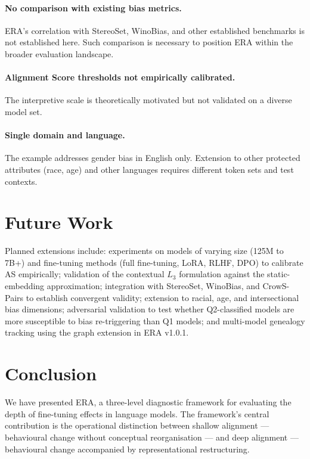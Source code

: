 \documentclass[11pt,a4paper]{article}
\begin{document}
\paragraph{No comparison with existing bias metrics.}
ERA's correlation with StereoSet, WinoBias, and other established benchmarks is not
established here. Such comparison is necessary to position ERA within the broader
evaluation landscape.

\paragraph{Alignment Score thresholds not empirically calibrated.}
The interpretive scale is theoretically motivated but not validated on a diverse model set.

\paragraph{Single domain and language.}
The example addresses gender bias in English only. Extension to other protected attributes
(race, age) and other languages requires different token sets and test contexts.

\section{Future Work}

Planned extensions include: experiments on models of varying size (125M to 7B+) and
fine-tuning methods (full fine-tuning, LoRA, RLHF, DPO) to calibrate AS empirically;
validation of the contextual $L_3$ formulation against the static-embedding approximation;
integration with StereoSet, WinoBias, and CrowS-Pairs to establish convergent validity;
extension to racial, age, and intersectional bias dimensions; adversarial validation to
test whether Q2-classified models are more susceptible to bias re-triggering than Q1
models; and multi-model genealogy tracking using the graph extension in ERA v1.0.1.

\section{Conclusion}

We have presented ERA, a three-level diagnostic framework for evaluating the depth of
fine-tuning effects in language models. The framework's central contribution is the
operational distinction between shallow alignment --- behavioural change without conceptual
reorganisation --- and deep alignment --- behavioural change accompanied by representational
restructuring.
\end{document}
